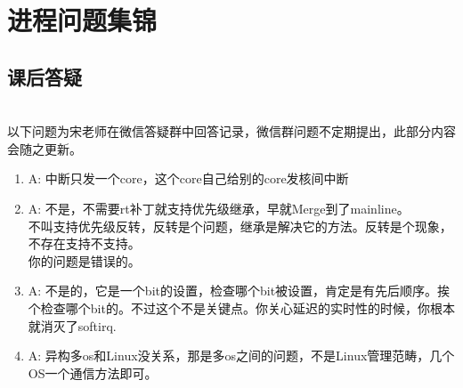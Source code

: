 

\partabstractfp{}
\partabstractrp{}

\part{进程问题集锦}

\chapter{课后答疑}


~\\以下问题为宋老师在微信答疑群中回答记录，微信群问题不定期提出，此部分内容会随之更新。
\begin{enumerate}
  \item
\begin{tcolorbox}[colback=green!5,colframe=green!75!black]
\tcblower
A: 中断只发一个core，这个core自己给别的core发核间中断
\end{tcolorbox}

  \item
\begin{tcolorbox}[colback=green!5,colframe=green!75!black]
\tcblower
A: 不是，不需要rt补丁就支持优先级继承，早就Merge到了mainline。\\
不叫支持优先级反转，反转是个问题，继承是解决它的方法。反转是个现象，不存在支持不支持。\\
你的问题是错误的。
\end{tcolorbox}


  \item
\begin{tcolorbox}[colback=green!5,colframe=green!75!black]
\tcblower
A: 不是的，它是一个bit的设置，检查哪个bit被设置，肯定是有先后顺序。挨个检查哪个bit的。不过这个不是关键点。你关心延迟的实时性的时候，你根本就消灭了softirq.
\end{tcolorbox}

  \item
\begin{tcolorbox}[colback=green!5,colframe=green!75!black]
\tcblower
A: 异构多os和Linux没关系，那是多os之间的问题，不是Linux管理范畴，几个OS一个通信方法即可。
\end{tcolorbox}


\end{enumerate}
